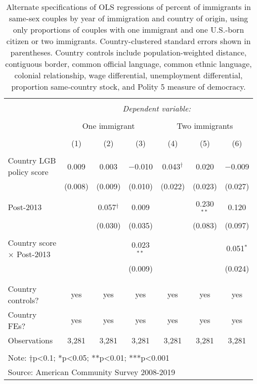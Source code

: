 \documentclass[
  11pt,
]{article}
\begin{document}
\begin{table}[!htbp] \centering 
  \caption{Alternate specifications of OLS regressions of percent of immigrants in same-sex couples by year of immigration and country of origin, using only proportions of couples with one immigrant and one U.S.-born citizen or two immigrants. Country-clustered standard errors shown in parentheses. Country controls include population-weighted distance, contiguous border, common official language, common ethnic language, colonial relationship, wage differential, unemployment differential, proportion same-country stock, and Polity 5 measure of democracy.} 
  \label{tab:country-props-alt2} 
\begin{tabular}{@{\extracolsep{5pt}}lcccccc} 
\\[-1.8ex]\hline 
\hline \\[-1.8ex] 
 & \multicolumn{6}{c}{\textit{Dependent variable:}} \\ 
\cline{2-7} 
\\[-1.8ex] & \multicolumn{3}{c}{One immigrant} & \multicolumn{3}{c}{Two immigrants} \\ 
\\[-1.8ex] & (1) & (2) & (3) & (4) & (5) & (6)\\ 
\hline \\[-1.8ex] 
 Country LGB policy score & 0.009 & 0.003 & $-$0.010 & 0.043$^{†}$ & 0.020 & $-$0.009 \\ 
  & (0.008) & (0.009) & (0.010) & (0.022) & (0.023) & (0.027) \\ 
  & & & & & & \\ 
 Post-2013 &  & 0.057$^{†}$ & 0.009 &  & 0.230$^{**}$ & 0.120 \\ 
  &  & (0.030) & (0.035) &  & (0.083) & (0.097) \\ 
  & & & & & & \\ 
 Country score × Post-2013 &  &  & 0.023$^{**}$ &  &  & 0.051$^{*}$ \\ 
  &  &  & (0.009) &  &  & (0.024) \\ 
  & & & & & & \\ 
\hline \\[-1.8ex] 
Country controls? & yes & yes & yes & yes & yes & yes \\ 
Country FEs? & yes & yes & yes & yes & yes & yes \\ 
Observations & 3,281 & 3,281 & 3,281 & 3,281 & 3,281 & 3,281 \\ 
\hline 
\hline \\[-1.8ex] 
\multicolumn{7}{l}{Note: †p<0.1; *p<0.05; **p<0.01; ***p<0.001} \\ 
\multicolumn{7}{l}{Source: American Community Survey 2008-2019} \\ 
\end{tabular} 
\end{table}
\end{document}
